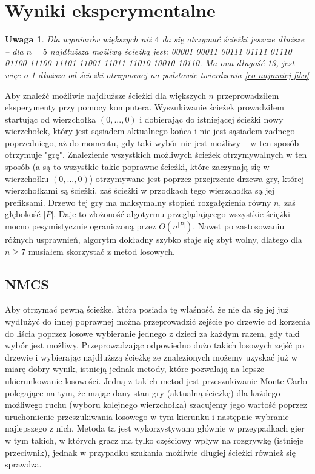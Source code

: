 \documentclass{pracamgr}
\newtheorem{remark}[theorem]{Uwaga}
\begin{document}
   \section{Wyniki eksperymentalne}
    \begin{remark}\label{da sie dluzsze}
     Dla wymiarów większych niż $4$ da się otrzymać ścieżki jeszcze dłuższe -- dla $n=5$ najdłuższa możliwą ścieżką jest:
     00001
     00011
     00111
     01111
     01110
     01100
     11100
     11101
     11001
     11011
     11010
     10010
     10110.\newline
     Ma ona długość 13, jest więc o 1 dłuższa od ścieżki otrzymanej na podstawie twierdzenia \ref{co najmniej fibo}
    \end{remark}
    Aby znaleźć możliwie najdłuższe ścieżki dla większych $n$ przeprowadziłem eksperymenty przy pomocy komputera.
    Wyszukiwanie ścieżek prowadziłem startując od wierzchołka $(0,...,0)$ i dobierając do istniejącej ścieżki nowy wierzchołek,
    który jest sąsiadem aktualnego końca i nie jest sąsiadem żadnego poprzedniego, aż do momentu, gdy taki wybór nie jest możliwy 
    -- w ten sposób otrzymuje "grę". Znalezienie wszystkich możliwych ścieżek otrzymywalnych w ten sposób
    (a są to wszystkie takie poprawne ścieżki, które zaczynają się w wierzchołku $(0,...,0)$) otrzymywane jest poprzez przejrzenie
    drzewa gry, której wierzchołkami są ścieżki, zaś ścieżki w przodkach tego wierzchołka są jej prefiksami.
    Drzewo tej gry ma maksymalny stopień rozgałęzienia równy $n$, zaś głębokość $|P|$.\newline
    Daje to złożoność algotyrmu przeglądającego wszystkie ściężki mocno pesymistycznie ograniczoną przez $O(n^{|P|})$. Nawet po zastosowaniu
    różnych usprawnień, algorytm dokładny szybko staje się zbyt wolny, dlatego dla $n\ge7$ musiałem skorzystać z metod losowych.
    \subsection{NMCS}
     Aby otrzymać pewną ścieżke, która posiada tę właśność, że nie da się jej już wydłużyć do innej poprawnej można przeprowadzić zejście po drzewie
     od korzenia do liścia poprzez losowe wybieranie jednego z dzieci za każdym razem, gdy taki wybór jest możliwy.\newline
     Przeprowadzając odpowiedno dużo takich losowych zejść po drzewie i wybierając najdłuższą ścieżkę ze znalezionych możemy uzyskać już w miarę dobry
     wynik, istnieją jednak metody, które pozwalają na lepsze ukierunkowanie losowości.\newline
     Jedną z takich metod jest przeszukiwanie Monte Carlo polegające na tym, że mając dany stan gry (aktualną ścieżkę) dla każdego możliwego ruchu
     (wyboru kolejnego wierzchołka) szacujemy jego wartość poprzez uruchomienie przeszukiwania losowego w tym kierunku i następnie wybranie najlepszego z nich.
     Metoda ta jest wykorzystywana głównie w przeypadkach gier w tym takich, w których gracz ma tylko częściowy wpływ na rozgrywkę (istnieje przeciwnik),
     jednak w przypadku szukania możliwie długiej ścieżki również się sprawdza.
     
\end{document}
